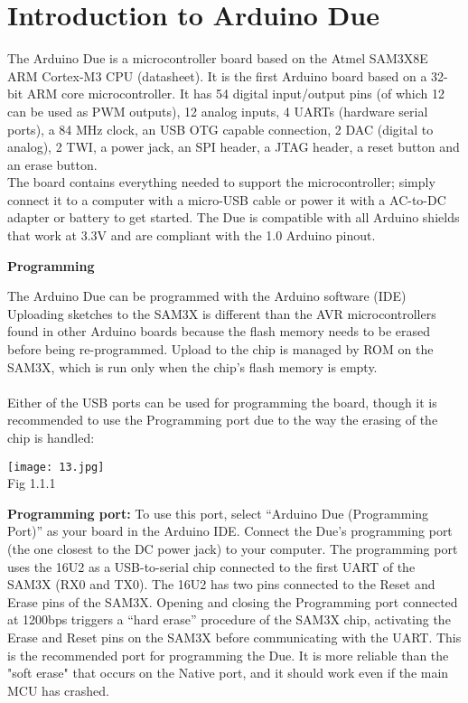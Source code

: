 \documentclass[12pt]{report}
\begin{document}
\section{\large Introduction to Arduino Due}
The Arduino Due is a microcontroller board based on the Atmel SAM3X8E ARM Cortex-M3 CPU (datasheet). It is the first Arduino board based on a 32-bit ARM core microcontroller. It has 54 digital input/output pins (of which 12 can be used as PWM outputs), 12 analog inputs, 4 UARTs (hardware serial ports), a 84 MHz clock, an USB OTG capable connection, 2 DAC (digital to analog), 2 TWI, a power jack, an SPI header, a JTAG header, a reset button and an erase button.\\The board contains everything needed to support the microcontroller; simply connect it to a computer with a micro-USB cable or power it with a AC-to-DC adapter or battery to get started. The Due is compatible with all Arduino shields that work at 3.3V and are compliant with the 1.0 Arduino pinout.
\begin{flushleft}
\textbf{Programming}\\
\end{flushleft}
\textup{The Arduino Due can be programmed with the Arduino software (IDE)\\
Uploading sketches to the SAM3X is different than the AVR microcontrollers found in other Arduino boards because the flash memory needs to be erased before being re-programmed. Upload to the chip is managed by ROM on the SAM3X, which is run only when the chip's flash memory is empty.\\}
\textup{\vspace{2pt}\\Either of the USB ports can be used for programming the board, though it is recommended to use the Programming port due to the way the erasing of the chip is handled:}
\begin{center}
\texttt{[image: 13.jpg]}\\
\textup{\footnotesize Fig 1.1.1}
\end{center}
\textbf{Programming port:}
\textup{To use this port, select ``Arduino Due (Programming Port)'' as your board in the Arduino IDE. Connect the Due's programming port (the one closest to the DC power jack) to your computer. The programming port uses the 16U2 as a USB-to-serial chip connected to the first UART of the SAM3X (RX0 and TX0). The 16U2 has two pins connected to the Reset and Erase pins of the SAM3X. Opening and closing the Programming port connected at 1200bps triggers a “hard erase” procedure of the SAM3X chip, activating the Erase and Reset pins on the SAM3X before communicating with the UART. This is the recommended port for programming the Due. It is more reliable than the "soft erase" that occurs on the Native port, and it should work even if the main MCU has crashed.\\}
\end{document}
